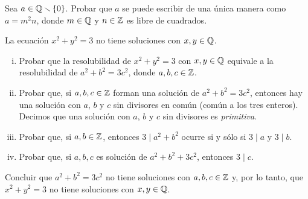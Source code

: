 \begin{ejerPrimos}
	Sea $a\in\mathbb{Q}\smallsetminus\{0\}$. Probar que $a$ se puede
	escribir de una \'unica manera como $a=m^2n$, donde
	$m\in\mathbb{Q}$ y $n\in\mathbb{Z}$ es libre de cuadrados.
\end{ejerPrimos}

\begin{ejerPrimos}
	La ecuaci\'on $x^2+y^2=3$ no tiene soluciones con $x,y\in\mathbb{Q}$.
	\begin{enumerate}[(i)]
		\item Probar que la resolubilidad de $x^2+y^2=3$ con
			$x,y\in\mathbb{Q}$ equivale a la resolubilidad
			de $a^2+b^2=3c^2$, donde $a,b,c\in\mathbb{Z}$.
		\item Probar que, si $a,b,c\in\mathbb{Z}$ forman una
			soluci\'on de $a^2+b^2=3c^2$, entonces hay una
			soluci\'on con $a$, $b$ y $c$ sin divisores en
			com\'un (com\'un a los tres enteros).
			Decimos que una soluci\'on con $a$, $b$ y $c$ sin
			divisores es \emph{primitiva}.
		\item Probar que, si $a,b\in\mathbb{Z}$, entonces
			$3\mid a^2+b^2$ ocurre si y s\'olo si
			$3\mid a$ y $3\mid b$.
		\item Probar que, si $a,b,c$ es soluci\'on de
			$a^2+b^2+3c^2$, entonces $3\mid c$.
	\end{enumerate}
	Concluir que $a^2+b^2=3c^2$ no tiene soluciones con
	$a,b,c\in\mathbb{Z}$ y, por lo tanto, que
	$x^2+y^2=3$ no tiene soluciones con $x,y\in\mathbb{Q}$.
\end{ejerPrimos}

